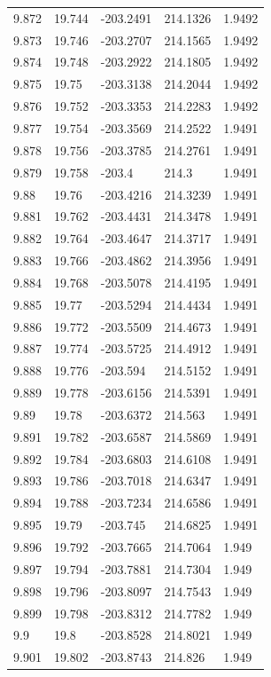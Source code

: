 \begin{tabular}{lllll}
9.872 & 19.744 & -203.2491 & 214.1326 & 1.9492 \\
9.873 & 19.746 & -203.2707 & 214.1565 & 1.9492 \\
9.874 & 19.748 & -203.2922 & 214.1805 & 1.9492 \\
9.875 & 19.75 & -203.3138 & 214.2044 & 1.9492 \\
9.876 & 19.752 & -203.3353 & 214.2283 & 1.9492 \\
9.877 & 19.754 & -203.3569 & 214.2522 & 1.9491 \\
9.878 & 19.756 & -203.3785 & 214.2761 & 1.9491 \\
9.879 & 19.758 & -203.4 & 214.3 & 1.9491 \\
9.88 & 19.76 & -203.4216 & 214.3239 & 1.9491 \\
9.881 & 19.762 & -203.4431 & 214.3478 & 1.9491 \\
9.882 & 19.764 & -203.4647 & 214.3717 & 1.9491 \\
9.883 & 19.766 & -203.4862 & 214.3956 & 1.9491 \\
9.884 & 19.768 & -203.5078 & 214.4195 & 1.9491 \\
9.885 & 19.77 & -203.5294 & 214.4434 & 1.9491 \\
9.886 & 19.772 & -203.5509 & 214.4673 & 1.9491 \\
9.887 & 19.774 & -203.5725 & 214.4912 & 1.9491 \\
9.888 & 19.776 & -203.594 & 214.5152 & 1.9491 \\
9.889 & 19.778 & -203.6156 & 214.5391 & 1.9491 \\
9.89 & 19.78 & -203.6372 & 214.563 & 1.9491 \\
9.891 & 19.782 & -203.6587 & 214.5869 & 1.9491 \\
9.892 & 19.784 & -203.6803 & 214.6108 & 1.9491 \\
9.893 & 19.786 & -203.7018 & 214.6347 & 1.9491 \\
9.894 & 19.788 & -203.7234 & 214.6586 & 1.9491 \\
9.895 & 19.79 & -203.745 & 214.6825 & 1.9491 \\
9.896 & 19.792 & -203.7665 & 214.7064 & 1.949 \\
9.897 & 19.794 & -203.7881 & 214.7304 & 1.949 \\
9.898 & 19.796 & -203.8097 & 214.7543 & 1.949 \\
9.899 & 19.798 & -203.8312 & 214.7782 & 1.949 \\
9.9 & 19.8 & -203.8528 & 214.8021 & 1.949 \\
9.901 & 19.802 & -203.8743 & 214.826 & 1.949 \\

\end{tabular}
